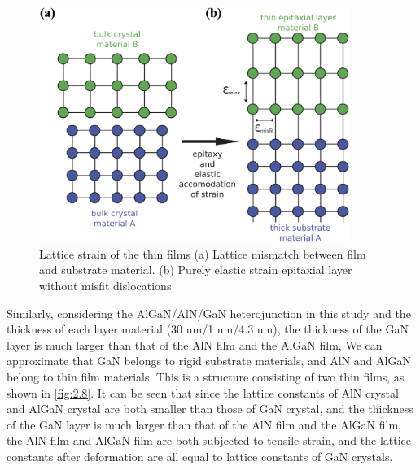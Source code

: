 \begin{figure}[H] 
\centering    
\includegraphics[width=0.9\textwidth]{ch2_7}
\caption[Lattice strain of the thin films]{Lattice strain of the thin films (a) Lattice mismatch between film and substrate material. (b) Purely elastic strain epitaxial layer without misfit dislocations \protect\cite{lopuszynski2012ordering}}
\label{fig:2.7}
\end{figure}

Similarly, considering the  AlGaN/AlN/GaN heterojunction in this study and the thickness of each layer material (30 \unit{nm}/1 \unit{nm}/4.3 \unit{um}), the thickness of the GaN layer is much larger than that of the AlN film and the AlGaN film, We can approximate that GaN belongs to rigid substrate  materials, and AlN and AlGaN belong to  thin film materials. This is a structure consisting of two thin films, as shown in \autoref{fig:2.8}. It can be seen that since the lattice constants  of AlN crystal and AlGaN crystal  are both smaller than those of GaN crystal, and the thickness of the GaN layer is much larger than that of the AlN film and the AlGaN film, the AlN film and AlGaN film are both subjected to tensile strain, and the lattice constants after deformation  are all equal to lattice constants of GaN crystals.

